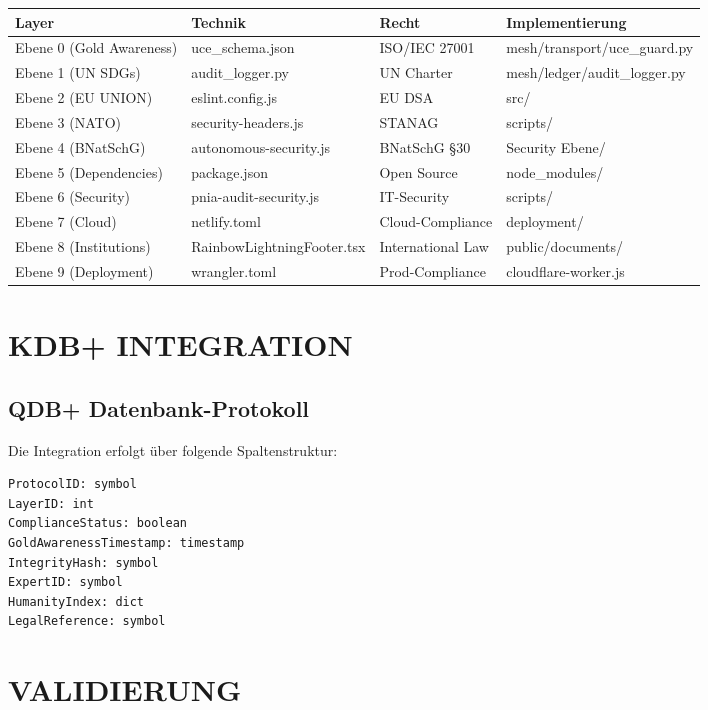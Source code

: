 \documentclass[11pt,a4paper]{report}
\begin{document}
\begin{longtable}{|p{3cm}|p{3cm}|p{3cm}|p{3cm}|}
\hline
\textbf{Layer} & \textbf{Technik} & \textbf{Recht} & \textbf{Implementierung} \\
\hline
\endhead

Ebene 0 (Gold Awareness) & uce\_schema.json & ISO/IEC 27001 & mesh/transport/uce\_guard.py \\
Ebene 1 (UN SDGs) & audit\_logger.py & UN Charter & mesh/ledger/audit\_logger.py \\
Ebene 2 (EU UNION) & eslint.config.js & EU DSA & src/ \\
Ebene 3 (NATO) & security-headers.js & STANAG & scripts/ \\
Ebene 4 (BNatSchG) & autonomous-security.js & BNatSchG §30 & Security Ebene/ \\
Ebene 5 (Dependencies) & package.json & Open Source & node\_modules/ \\
Ebene 6 (Security) & pnia-audit-security.js & IT-Security & scripts/ \\
Ebene 7 (Cloud) & netlify.toml & Cloud-Compliance & deployment/ \\
Ebene 8 (Institutions) & RainbowLightningFooter.tsx & International Law & public/documents/ \\
Ebene 9 (Deployment) & wrangler.toml & Prod-Compliance & cloudflare-worker.js \\
\hline
\end{longtable}

\chapter{KDB+ INTEGRATION}

\section{QDB+ Datenbank-Protokoll}

Die Integration erfolgt über folgende Spaltenstruktur:

\begin{verbatim}
ProtocolID: symbol
LayerID: int
ComplianceStatus: boolean
GoldAwarenessTimestamp: timestamp
IntegrityHash: symbol
ExpertID: symbol
HumanityIndex: dict
LegalReference: symbol
\end{verbatim}

\chapter{VALIDIERUNG}
\end{document}
